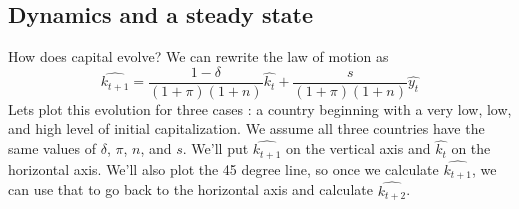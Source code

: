 \documentclass[12pt,english]{article}
\begin{document}
\subsection{Dynamics and a steady state}

How does capital evolve? We can rewrite the law of motion as
$$ \widehat{k_{t+1}} = \frac{1 - \delta}{(1 + \pi)(1 + n)} \widehat{k_{t}} + \frac{s}{(1 + \pi)(1 + n)} \widehat{y_{t}} $$
Lets plot this evolution for three cases : a country beginning with a very low, low, and high level of initial capitalization. We assume all three countries have the same values of $\delta$, $\pi$, $n$, and $s$. We'll put $\widehat{k_{t + 1}}$ on the vertical axis and $\widehat{k_{t}}$ on the horizontal axis. We'll also plot the 45 degree line, so once we calculate $\widehat{k_{t + 1}}$, we can use that to go back to the horizontal axis and calculate $\widehat{k_{t + 2}}$.
\end{document}
